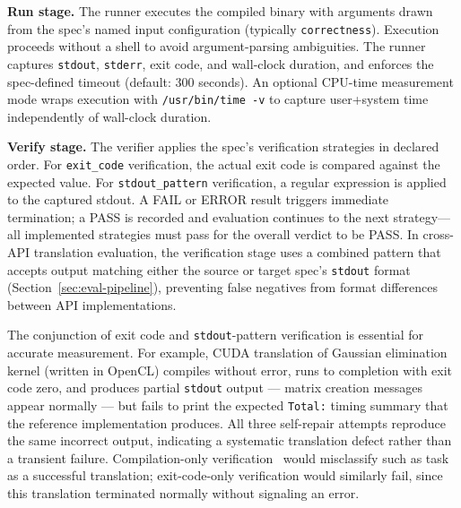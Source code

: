\documentclass{article}
\begin{document}
\textbf{Run stage.} The runner executes the compiled binary with arguments drawn from the spec's named input configuration (typically \texttt{correctness}). Execution proceeds without a shell to avoid argument-parsing ambiguities. The runner captures \texttt{stdout}, \texttt{stderr}, exit code, and wall-clock duration, and enforces the spec-defined timeout (default: 300 seconds). An optional CPU-time measurement mode wraps execution with \texttt{/usr/bin/time -v} to capture user+system time independently of wall-clock duration.

\textbf{Verify stage.} The verifier applies the spec's verification strategies in declared order. For \texttt{exit\_code} verification, the actual exit code is compared against the expected value. For \texttt{stdout\_pattern} verification, a regular expression is applied to the captured stdout. A FAIL or ERROR result triggers immediate termination; a PASS is recorded and evaluation continues to the next strategy---all implemented strategies must pass for the overall verdict to be PASS. In cross-API translation evaluation, the verification stage uses a combined pattern that accepts output matching either the source or target spec's \texttt{stdout} format (Section~\ref{sec:eval-pipeline}), preventing false negatives from format differences between API implementations. 

The conjunction of exit code and \texttt{stdout}-pattern verification is essential for accurate measurement. For example, CUDA translation of Gaussian elimination kernel (written in OpenCL) compiles without error, runs to completion with exit code zero, and produces partial \texttt{stdout} output --- matrix creation messages appear normally --- but fails to print the expected \texttt{Total:} timing summary that the reference implementation produces. All three self-repair attempts reproduce the same incorrect output, indicating a systematic translation defect rather than a transient failure. Compilation-only verification~\cite{CodeRosetta2024} would misclassify such as task as a successful translation; exit-code-only verification would similarly fail, since this translation terminated normally without signaling an error.

\end{document}
